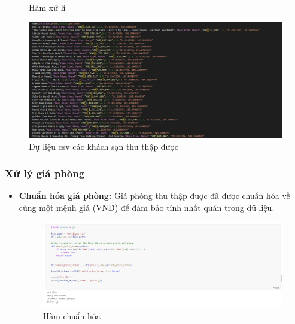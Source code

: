 \begin{itemize}
\begin{figure}[H]
        \caption{Hàm xử lí}
        \label{fig:iot}
    \end{figure}
    \begin{figure}[H] %
        \centering
        \includegraphics[width=1.0\linewidth]{Figures/2.14.png}
        \caption{Dự liệu csv các khách sạn thu thập được}
        \label{fig:iot}
    \end{figure}
\end{itemize}

\subsubsection{Xử lý giá phòng}
\begin{itemize}
    \item \textbf{Chuẩn hóa giá phòng:} Giá phòng thu thập được đã được chuẩn hóa về cùng một mệnh giá (VND) để đảm bảo tính nhất quán trong dữ liệu.
    \begin{figure}[H] %
        \centering
        \includegraphics[width=0.8\linewidth]{Figures/2.15.png}
        \caption{Hàm chuẩn hóa}
        \label{fig:iot}
    \end{figure}
\end{itemize}

